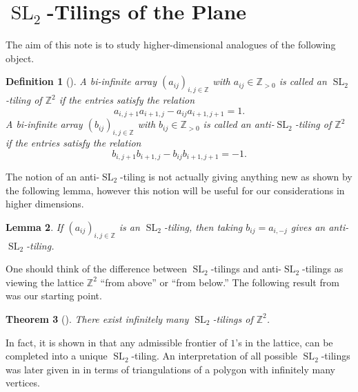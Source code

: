 \documentclass[11pt,reqno]{amsart}
\newtheorem{theorem}{Theorem}
\newtheorem{definition}[theorem]{Definition}
\newtheorem{lemma}[theorem]{Lemma}
\newcommand{\SL}{\operatorname{SL}}
\newcommand{\ZZ}{\mathbb{Z}}
\begin{document}
\section{$\SL_2$-Tilings of the Plane}
  The aim of this note is to study higher-dimensional analogues of the following object.
  \begin{definition}[\cite{AssemReutenauerSmith}]
    A bi-infinite array $(a_{ij})_{i,j\in\ZZ}$ with $a_{ij}\in\ZZ_{>0}$ is called an \emph{$\SL_2$-tiling of $\ZZ^2$} if the entries satisfy the relation
    \begin{equation}\label{eq:sl2 recursion}
      a_{i,j+1}a_{i+1,j}-a_{ij}a_{i+1,j+1}=1.
    \end{equation}
    A bi-infinite array $(b_{ij})_{i,j\in\ZZ}$ with $b_{ij}\in\ZZ_{>0}$  is called an \emph{anti-$\SL_2$-tiling of $\ZZ^2$} if the entries satisfy the relation
    \begin{equation}\label{eq:anti-sl2 recursion}
      b_{i,j+1}b_{i+1,j}-b_{ij}b_{i+1,j+1}=-1.
    \end{equation}
  \end{definition}
  The notion of an anti-$\SL_2$-tiling is not actually giving anything new as shown by the following lemma, however this notion will be useful for our considerations in higher dimensions.
  \begin{lemma}
    If $(a_{ij})_{i,j\in\ZZ}$ is an $\SL_2$-tiling, then taking $b_{ij}=a_{i,-j}$ gives an anti-$\SL_2$-tiling.
  \end{lemma}
  One should think of the difference between $\SL_2$-tilings and anti-$\SL_2$-tilings as viewing the lattice $\ZZ^2$ ``from above'' or ``from below.''  
  The following result from \cite{AssemReutenauerSmith} was our starting point.
  \begin{theorem}[\cite{AssemReutenauerSmith}]
    There exist infinitely many $\SL_2$-tilings of $\ZZ^2$.
  \end{theorem}

  In fact, it is shown in \cite{AssemReutenauerSmith} that any admissible frontier of $1$'s in the lattice, can be completed into a unique $\SL_2$-tiling.  
  An interpretation of all possible $\SL_2$-tilings was later given in \cite{BessenrodtHolmJorgensen} in terms of triangulations of a polygon with infinitely many vertices.
\end{document}
